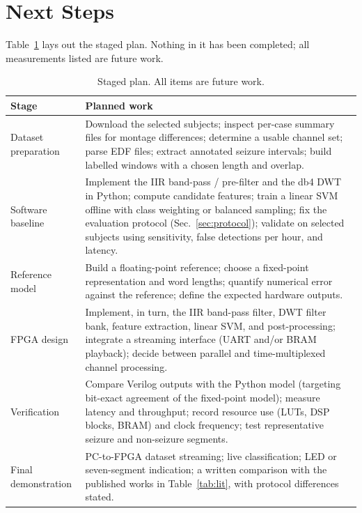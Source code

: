 \documentclass[10pt,twocolumn,letterpaper]{article}
\begin{document}
\section{Next Steps}
\label{sec:next}

Table~\ref{tab:plan} lays out the staged plan. Nothing in it has been
completed; all measurements listed are future work.

\begin{table}[t]
\centering
\caption{Staged plan. All items are future work.}
\label{tab:plan}
\small
\begin{tabularx}{\textwidth}{@{}p{3.2cm}X@{}}
\toprule
Stage & Planned work \\
\midrule
Dataset preparation & Download the selected subjects; inspect per-case summary files for montage differences; determine a usable channel set; parse EDF files; extract annotated seizure intervals; build labelled windows with a chosen length and overlap. \\
Software baseline & Implement the IIR band-pass / pre-filter and the db4 DWT in Python; compute candidate features; train a linear SVM offline with class weighting or balanced sampling; fix the evaluation protocol (Sec.~\ref{sec:protocol}); validate on selected subjects using sensitivity, false detections per hour, and latency. \\
Reference model & Build a floating-point reference; choose a fixed-point representation and word lengths; quantify numerical error against the reference; define the expected hardware outputs. \\
FPGA design & Implement, in turn, the IIR band-pass filter, DWT filter bank, feature extraction, linear SVM, and post-processing; integrate a streaming interface (UART and/or BRAM playback); decide between parallel and time-multiplexed channel processing. \\
Verification & Compare Verilog outputs with the Python model (targeting bit-exact agreement of the fixed-point model); measure latency and throughput; record resource use (LUTs, DSP blocks, BRAM) and clock frequency; test representative seizure and non-seizure segments. \\
Final demonstration & PC-to-FPGA dataset streaming; live classification; LED or seven-segment indication; a written comparison with the published works in Table~\ref{tab:lit}, with protocol differences stated. \\
\bottomrule
\end{tabularx}
\end{table}
\end{document}
